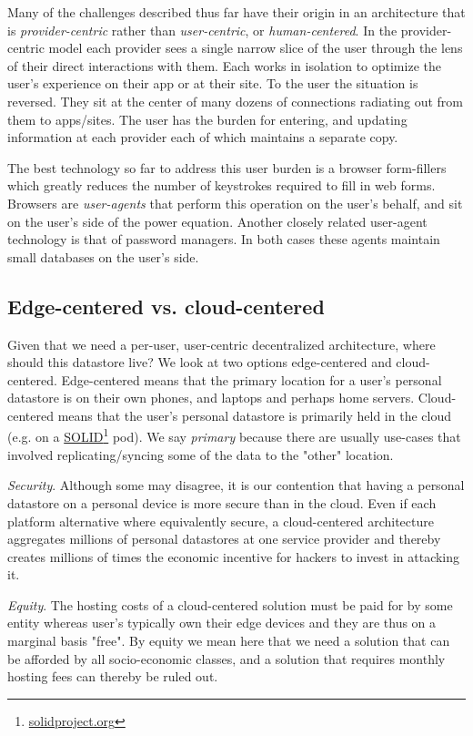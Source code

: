 \documentclass[11pt, oneside]{article}   	%
\newcommand{\hyperfootnote}[1][]{\def\ArgI{{#1}}\hyperfootnoteRelay}
\newcommand\hyperfootnoteRelay[2][]{\href{#1#2}{\ArgI}\footnote{\href{#1#2}{#2}}}
\begin{document}
Many of the challenges described thus far have their origin in an architecture that is \emph{provider-centric} rather than \emph{user-centric}, or \emph{human-centered}. In the provider-centric model each provider sees a single narrow slice of the user through the lens of their direct interactions with them. Each works in isolation to optimize the user's experience on their app or at their site. To the user the situation is reversed. They sit at the center of many dozens of connections radiating out from them to apps/sites. The user has the burden for entering, and updating information at each provider each of which maintains a separate copy. 

The best technology so far to address this user burden is a browser form-fillers which greatly reduces the number of keystrokes required to fill in web forms. Browsers are \emph{user-agents} that perform this operation on the user's behalf, and sit on the user's side of the power equation. Another closely related user-agent technology is that of password managers. In both cases these agents maintain small databases on the user's side.

\subsection{Edge-centered vs. cloud-centered}
Given that we need a per-user, user-centric decentralized architecture, where should this datastore live? We look at two options edge-centered and cloud-centered. Edge-centered means that the primary location for a user's personal datastore is on their own phones, and laptops and perhaps home servers. Cloud-centered means that the user's personal datastore is primarily held in the cloud (e.g. on a \hyperfootnote[SOLID][https://]{solidproject.org} pod). We say \emph{primary} because there are usually use-cases that involved replicating/syncing some of the data to the "other" location. 

\emph{Security}. Although some may disagree, it is our contention that having a personal datastore on a personal device is more secure than in the cloud. Even if each platform alternative where equivalently secure, a cloud-centered architecture aggregates millions of personal datastores at one service provider and thereby creates millions of times the economic incentive for hackers to invest in attacking it. 

\emph{Equity}. The hosting costs of a cloud-centered solution must be paid for by some entity whereas user's typically own their edge devices and they are thus on a marginal basis "free". By equity we mean here that we need a solution that can be afforded by all socio-economic classes, and a solution that requires monthly hosting fees can thereby be ruled out. 
\end{document}
